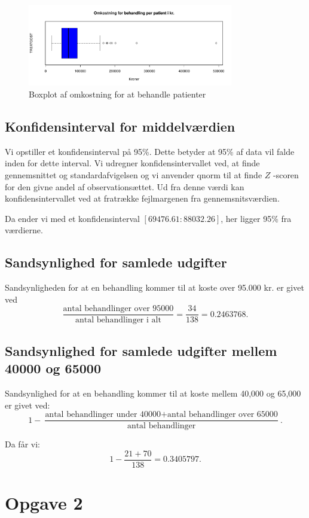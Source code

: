 \documentclass{article}
\begin{document}
\begin{figure}[H]
  \centering
  \includegraphics[width=0.8\textwidth]{./plots/costboxplot.pdf}
  \caption{Boxplot af omkostning for at behandle patienter}
\end{figure}

\subsection{Konfidensinterval for middelværdien}
Vi opstiller et konfidensinterval på 95\%. Dette betyder at 95\% af data vil
falde inden for dette interval.
Vi udregner konfidensintervallet ved, at finde gennemsnittet og
standardafvigelsen og vi anvender qnorm til at finde $ Z $ -scoren for den givne
andel af observationsættet. Ud fra denne værdi kan konfidensintervallet ved at
fratrække fejlmargenen fra gennemsnitsværdien.

Da ender vi med et konfidensinterval $ [69476.61:88032.26] $, her ligger 95\%
fra værdierne.

\subsection{Sandsynlighed for samlede udgifter}
Sandsynligheden for at en behandling kommer til at koste over 95.000 kr. er
givet ved \[
\frac{\text{antal behandlinger over 95000}}{\text{antal behandlinger i alt}} =
\frac{34}{138} = 0.2463768
.\] 

\subsection{Sandsynlighed for samlede udgifter mellem 40000 og 65000}
Sandsynlighed for at en behandling kommer til at koste mellem 40,000 og 65,000
er givet ved: 
\[
1 - \frac{\text{antal behandlinger under 40000} + \text{antal behandlinger over
65000}}{\text{antal behandlinger}}
.\] 

Da får vi:
\[
1 - \frac{21 + 70 }{138} = 0.3405797
.\] 
\section{Opgave 2}
\end{document}
